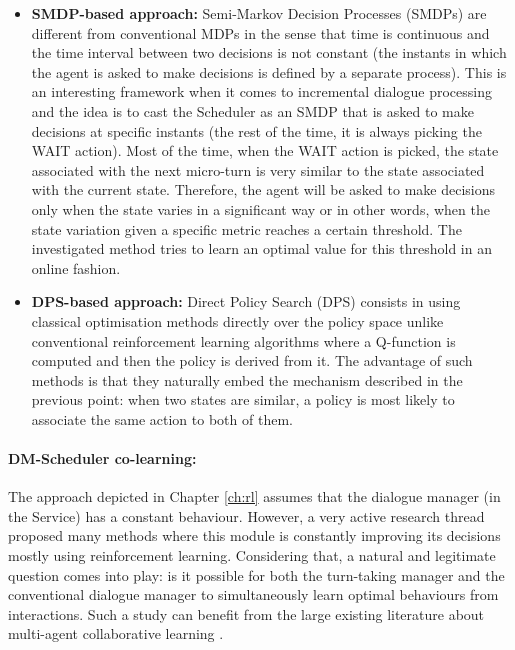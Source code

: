         \begin{itemize}
          \item \textbf{SMDP-based approach:} Semi-Markov Decision Processes (SMDPs) \cite{Bradtke1994} are different from conventional MDPs in the sense that time is continuous and the time interval between two decisions is not constant (the instants in which the agent is asked to make decisions is defined by a separate process). This is an interesting framework when it comes to incremental dialogue processing and the idea is to cast the Scheduler as an SMDP that is asked to make decisions at specific instants (the rest of the time, it is always picking the WAIT action). Most of the time, when the WAIT action is picked, the state associated with the next micro-turn is very similar to the state associated with the current state. Therefore, the agent will be asked to make decisions only when the state varies in a significant way or in other words, when the state variation given a specific metric reaches a certain threshold. The investigated method tries to learn an optimal value for this threshold in an online fashion.
          \item \textbf{DPS-based approach:} Direct Policy Search (DPS) consists in using classical optimisation methods directly over the policy space unlike conventional reinforcement learning algorithms where a Q-function is computed and then the policy is derived from it. The advantage of such methods is that they naturally embed the mechanism described in the previous point: when two states are similar, a policy is most likely to associate the same action to both of them.
        \end{itemize}

        \paragraph{DM-Scheduler co-learning:} The approach depicted in Chapter \ref{ch:rl} assumes that the dialogue manager (in the Service) has a constant behaviour. However, a very active research thread proposed many methods where this module is constantly improving its decisions mostly using reinforcement learning. Considering that, a natural and legitimate question comes into play: is it possible for both the turn-taking manager and the conventional dialogue manager to simultaneously learn optimal behaviours from interactions. Such a study can benefit from the large existing literature about multi-agent collaborative learning \cite{Claus1998,Panait2005,Vogel2013}.
